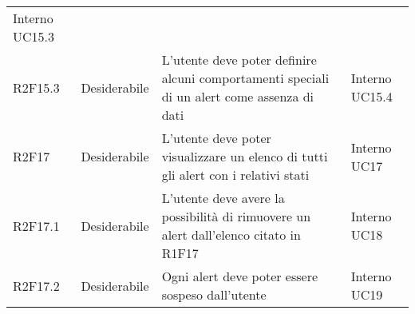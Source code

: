 \begin{longtable} {
		>{\centering}p{18mm} 
		>{\centering}p{28mm}
		>{}p{50mm} 
		>{}p{28mm}
	}
		Interno UC15.3 \TBstrut \\ [2mm]

		

		R2F15.3 &

		Desiderabile &

		L'utente deve poter definire alcuni comportamenti speciali di un alert come assenza di dati &

		Interno UC15.4 \TBstrut \\ [2mm]

		

		R2F17 &		

		Desiderabile & 

		L'utente deve poter visualizzare un elenco di tutti gli alert con i relativi stati & 

		Interno UC17 \TBstrut \\ [2mm]

		

		R2F17.1 & 

		Desiderabile & 

		L'utente deve avere la possibilità di rimuovere un alert dall'elenco citato in R1F17 & 

		Interno UC18 \TBstrut \\ [2mm]

		

		R2F17.2 &

		Desiderabile & 

		Ogni alert deve poter essere sospeso dall'utente & 

		Interno UC19 \TBstrut \\ [2mm]

		

	\end{longtable}